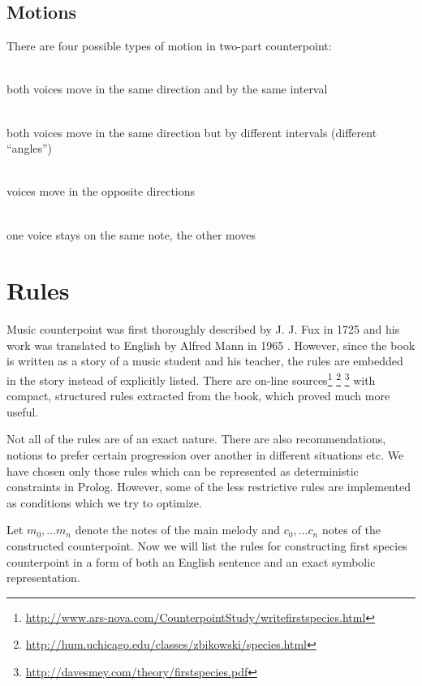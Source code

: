 \documentclass[11pt]{article} %
\begin{document}
\subsection{Motions}
There are four possible types of motion in two-part counterpoint:
\begin{description}
\leftskip=20pt
\setlength{\itemsep}{0cm}%
  \setlength{\parskip}{0cm}%
\item[parallel motion] \hfill\\ both voices move in the same direction and by the same interval
\item[similar motion] \hfill\\both voices move in the same direction but by different intervals (different “angles”)
\item[contrary motion] \hfill\\voices move in the opposite directions
\item[oblique motion] \hfill\\one voice stays on the same note, the other moves
\end{description}
\section{Rules}
Music counterpoint was first thoroughly described by J. J. Fux in 1725 and his work was translated to English by Alfred Mann in 1965 \cite{fux}. However, since the book is written as a story of a music student and his teacher, the rules are embedded in the story instead of explicitly listed. There are on-line sources\footnote{\url{http://www.ars-nova.com/CounterpointStudy/writefirstspecies.html}} \footnote{\url{http://hum.uchicago.edu/classes/zbikowski/species.html}} \footnote{\url{http://davesmey.com/theory/firstspecies.pdf}} with compact, structured rules extracted from the book, which proved much more useful. 

Not all of the rules are of an exact nature. There are also recommendations, notions to prefer certain progression over another in different situations etc. We have chosen only those rules which can be represented as deterministic constraints in Prolog. However, some of the less restrictive rules are implemented as conditions which we try to optimize.

Let $m_0, \dots m_n$ denote the notes of the main melody and $c_0, \dots c_n$ notes of the constructed counterpoint. Now we will list the rules for constructing first species counterpoint in a form of both an English sentence and an exact symbolic representation.
\end{document}
